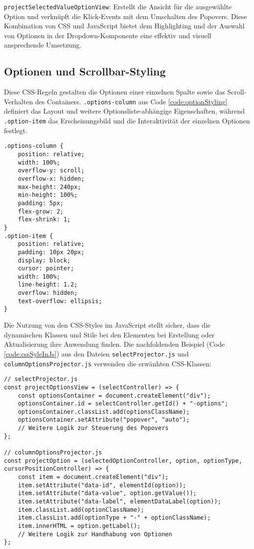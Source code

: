 \texttt{projectSelectedValueOptionView}: Erstellt die Ansicht für die ausgewählte Option und verknüpft die Klick-Events mit dem Umschalten des Popovers.
Diese Kombination von CSS und JavaScript bietet dem Highlighting und der Auswahl von Optionen in der Dropdown-Komponente eine effektiv und visuell ansprechende Umsetzung.


\subsection{Optionen und Scrollbar-Styling}
\label{sec:sizeLayoutChanges}

Diese CSS-Regeln gestalten die Optionen einer einzelnen Spalte sowie das Scroll-Verhalten des Containers. 
\texttt{.options-column} aus Code \ref{code:optionStyling} definiert das Layout und weitere Optionsliste-abhängige Eigenschaften, 
während \texttt{.option-item} das Erscheinungsbild und die Interaktivität der einzelnen Optionen festlegt.

\begin{lstlisting}[style = htmlcssjs, caption = Optionen und Scrollbar-Styling, label = code:optionStyling]
.options-column {
    position: relative;
    width: 100%;
    overflow-y: scroll;
    overflow-x: hidden;
    max-height: 240px;
    min-height: 100%;
    padding: 5px;
    flex-grow: 2;
    flex-shrink: 1;
}
.option-item {
    position: relative;
    padding: 10px 20px;
    display: block;
    cursor: pointer;
    width: 100%;
    line-height: 1.2;
    overflow: hidden;
    text-overflow: ellipsis;
} 
\end{lstlisting}

Die Nutzung von den CSS-Styles im JavaScript stellt sicher, dass die dynamischen Klassen und Stile bei den Elementen bei Erstellung oder Aktualisierung ihre Anwendung finden.
Die nachfoldenden Beispiel (Code \ref{code:cssSyleInJs}) aus den Dateien \texttt{selectProjector.js} und \texttt{columnOptionsProjector.js} verwenden die erwänhten CSS-Klassen:

\begin{lstlisting}[style = htmlcssjs, caption = CSS-Styles im JavaScript, label = code:cssSyleInJs]
// selectProjector.js
const projectOptionsView = (selectController) => {
    const optionsContainer = document.createElement("div");
    optionsContainer.id = selectController.getId() + "-options";
    optionsContainer.classList.add(optionsClassName);
    optionsContainer.setAttribute("popover", "auto");
    // Weitere Logik zur Steuerung des Popovers
};

// columnOptionsProjector.js
const projectOption = (selectedOptionController, option, optionType, cursorPositionController) => {
    const item = document.createElement("div");
    item.setAttribute("data-id", elementId(option));
    item.setAttribute("data-value", option.getValue());
    item.setAttribute("data-label", elementDataLabel(option));
    item.classList.add(optionClassName);
    item.classList.add(optionType + "-" + optionClassName);
    item.innerHTML = option.getLabel();
    // Weitere Logik zur Handhabung von Optionen
}; 
\end{lstlisting}

